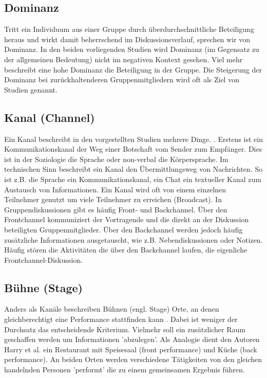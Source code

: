 \documentclass{seminarvorlage}
\begin{document}
\subsection{Dominanz}
Tritt ein Individuum aus einer Gruppe durch üb\-er\-durch\-schnitt\-liche
Beteiligung heraus und wirkt damit beherrschend im Diskussionsverlauf, sprechen
wir von Dominanz.
In den beiden vorliegenden Studien wird Dominanz (im Gegensatz zu der
allgemeinen Bedeutung) nicht im negativen Kontext gesehen. Viel mehr beschreibt
eine hohe Dominanz die Beteiligung in der Gruppe.
Die Steigerung der Dominanz bei zurückhaltenderen Gruppenmitgliedern wird oft
als Ziel von Studien genannt.

\subsection{Kanal (Channel)}
Ein Kanal beschreibt in den vorgestellten Studien mehrere Dinge.
\cite{BergKara2009-1}.
Erstens ist ein Kommunikationskanal der Weg einer Botschaft vom Sender zum
Empfänger. Dies ist in der Soziologie die Sprache oder non-verbal die
Kör\-per\-spra\-che.
Im technischen Sinn beschreibt ein Kanal den Über\-mitt\-lungs\-weg von
Nachrichten.
So ist z.B. die Sprache ein Kommunikationskanal, ein Chat ein textueller Kanal
zum Austausch von Informationen. Ein Kanal wird oft von einem einzelnen
Teilnehmer genutzt um viele Teilnehmer zu erreichen (Broadcast).
In Gruppendiskussionen gibt es häufig Front- und Backchannel. Über den
Frontchannel kommuniziert der Vortragende und die direkt an der Diskussion
beteiligten Gruppenmitglieder. Über den Backchannel werden jedoch häufig
zusätzliche Informationen ausgetauscht, wie z.B. Nebendiskussionen oder Notizen.
Häufig stören die Aktivitäten die über den Backchannel laufen, die eigenliche
Frontchannel-Diskussion.

\subsection{Bühne (Stage)}
Anders als Kanäle beschreiben Bühnen (engl. Stage) Orte, an denen
gleichberechtigt eine Performance stattfinden kann \cite{Goff1959}. Dabei ist
weniger der Durchsatz das entscheidende Kriterium. Vielmehr soll ein
zusätzlicher Raum geschaffen werden um Informationen 'abzulegen'. Als Analogie dient den
Autoren Harry et al. ein Restaurant mit Speisesaal (front performance) und Küche
(back performance).
An beiden Orten werden verschiedene Tätigkeiten von den gleichen handelnden
Personen 'performt' die zu einem gemeinsamen Ergebnis führen.
\end{document}
